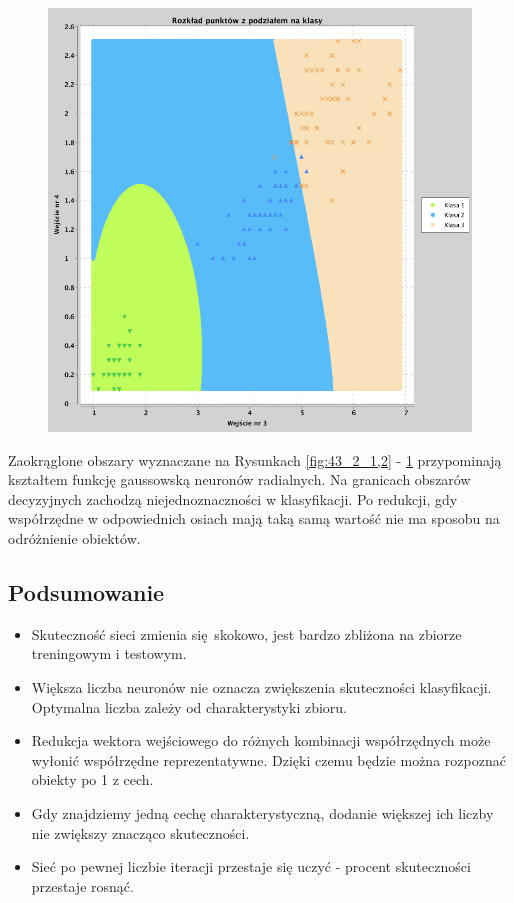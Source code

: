\documentclass[a4paper, portrait,11pt]{article}
\begin{document}
\begin{figure}[!htb]
\begin{minipage}{0.33\textwidth}
    \caption{\label{fig:43_2_2,4}}
  \end{minipage}
  \begin{minipage}{0.33\textwidth}
    \centering
    \includegraphics[width=1\linewidth]{../data/classification4/3/2_3,4.png}
    \caption{\label{fig:43_2_3,4}}
  \end{minipage}\hfill
\end{figure}

Zaokrąglone obszary wyznaczane na Rysunkach \ref{fig:43_2_1,2} - \ref{fig:43_2_3,4}
przypominają kształtem funkcję gaussowską neuronów radialnych.
Na granicach obszarów decyzyjnych zachodzą niejednoznaczności w klasyfikacji.
Po redukcji, gdy współrzędne w odpowiednich osiach mają taką samą wartość nie ma sposobu na odróżnienie obiektów.

\subsection{Podsumowanie}
\begin{itemize}
  \item Skuteczność sieci zmienia się skokowo, jest bardzo zbliżona na zbiorze treningowym i testowym.
  \item Większa liczba neuronów nie oznacza zwiększenia skuteczności klasyfikacji. Optymalna liczba zależy od charakterystyki zbioru.
  \item Redukcja wektora wejściowego do różnych kombinacji współrzędnych może wyłonić współrzędne reprezentatywne. Dzięki czemu będzie można rozpoznać obiekty po 1 z cech.
  \item Gdy znajdziemy jedną cechę charakterystyczną, dodanie większej ich liczby nie zwiększy znacząco skuteczności.
  \item Sieć po pewnej liczbie iteracji przestaje się uczyć - procent skuteczności przestaje rosnąć.
\end{itemize}
\end{document}

